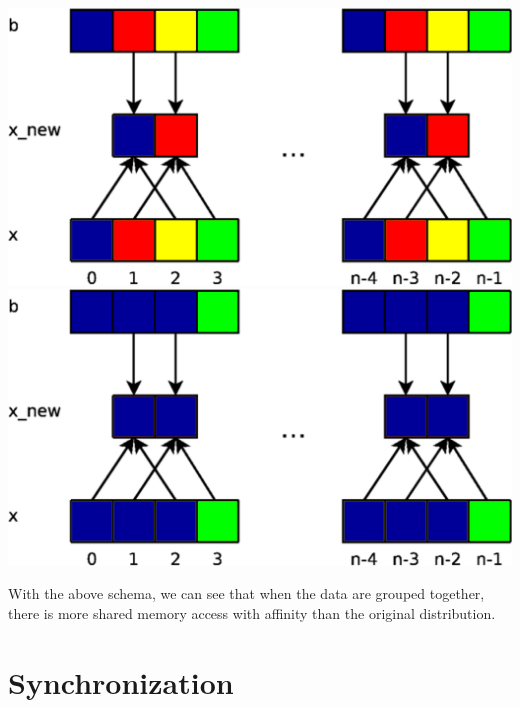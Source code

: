 \documentclass{report}
\begin{document}
\begin{center}
    \includegraphics[scale=0.070]{Images/Laplace_unoptimized_da.png}
    \label{fig4}
    \includegraphics[scale=0.070]{Images/Lapalce_optmized_data.png}
    \label{fig5}
\end{center}

With the above schema, we can see that when the data are grouped together, there is more shared memory access with affinity than the original distribution.

\section{Synchronization}
\end{document}
